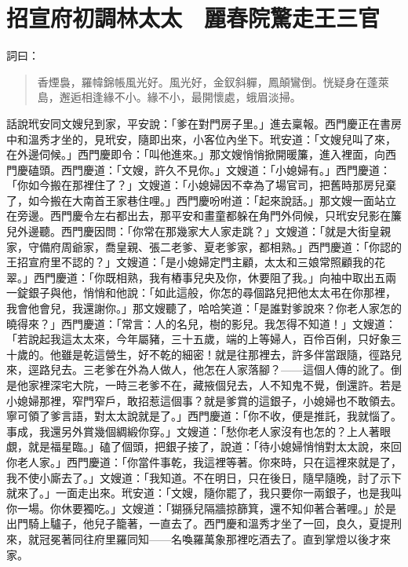 
\chapter{招宣府初調林太太　麗春院驚走王三官}

詞曰：
\begin{quote}
香煙裊，羅幃錦帳風光好。風光好，金釵斜軃，鳳顛鸞倒。恍疑身在蓬萊島，邂逅相逢緣不小。緣不小，最開懷處，蛾眉淡掃。
\end{quote}

話說玳安同文嫂兒到家，平安說：「爹在對門房子里。」進去稟報。西門慶正在書房中和溫秀才坐的，見玳安，隨即出來，小客位內坐下。玳安道：「文嫂兒叫了來，在外邊伺候。」西門慶即令：「叫他進來。」那文嫂悄悄掀開暖簾，進入裡面，向西門慶磕頭。西門慶道：「文嫂，許久不見你。」文嫂道：「小媳婦有。」西門慶道：「你如今搬在那裡住了？」文嫂道：「小媳婦因不幸為了場官司，把舊時那房兒棄了，如今搬在大南首王家巷住哩。」西門慶吩咐道：「起來說話。」那文嫂一面站立在旁邊。西門慶令左右都出去，那平安和畫童都躲在角門外伺候，只玳安兒影在簾兒外邊聽。西門慶因問：「你常在那幾家大人家走跳？」文嫂道：「就是大街皇親家，守備府周爺家，喬皇親、張二老爹、夏老爹家，都相熟。」西門慶道：「你認的王招宣府里不認的？」文嫂道：「是小媳婦定門主顧，太太和三娘常照顧我的花翠。」西門慶道：「你既相熟，我有樁事兒央及你，休要阻了我。」向袖中取出五兩一錠銀子與他，悄悄和他說：「如此這般，你怎的尋個路兒把他太太弔在你那裡，我會他會兒，我還謝你。」那文嫂聽了，哈哈笑道：「是誰對爹說來？你老人家怎的曉得來？」西門慶道：「常言：人的名兒，樹的影兒。我怎得不知道！」文嫂道：「若說起我這太太來，今年屬豬，三十五歲，端的上等婦人，百伶百俐，只好象三十歲的。他雖是乾這營生，好不乾的細密！就是往那裡去，許多伴當跟隨，徑路兒來，逕路兒去。三老爹在外為人做人，他怎在人家落腳？——這個人傳的訛了。倒是他家裡深宅大院，一時三老爹不在，藏掖個兒去，人不知鬼不覺，倒還許。若是小媳婦那裡，窄門窄戶，敢招惹這個事？就是爹賞的這銀子，小媳婦也不敢領去。寧可領了爹言語，對太太說就是了。」西門慶道：「你不收，便是推託，我就惱了。事成，我還另外賞幾個綢緞你穿。」文嫂道：「愁你老人家沒有也怎的？上人著眼覷，就是福星臨。」磕了個頭，把銀子接了，說道：「待小媳婦悄悄對太太說，來回你老人家。」西門慶道：「你當件事乾，我這裡等著。你來時，只在這裡來就是了，我不使小廝去了。」文嫂道：「我知道。不在明日，只在後日，隨早隨晚，討了示下就來了。」一面走出來。玳安道：「文嫂，隨你罷了，我只要你一兩銀子，也是我叫你一場。你休要獨吃。」文嫂道：「猢猻兒隔牆掠篩箕，還不知仰著合著哩。」於是出門騎上驢子，他兒子籠著，一直去了。西門慶和溫秀才坐了一回，良久，夏提刑來，就冠冕著同往府里羅同知——名喚羅萬象那裡吃酒去了。直到掌燈以後才來家。

